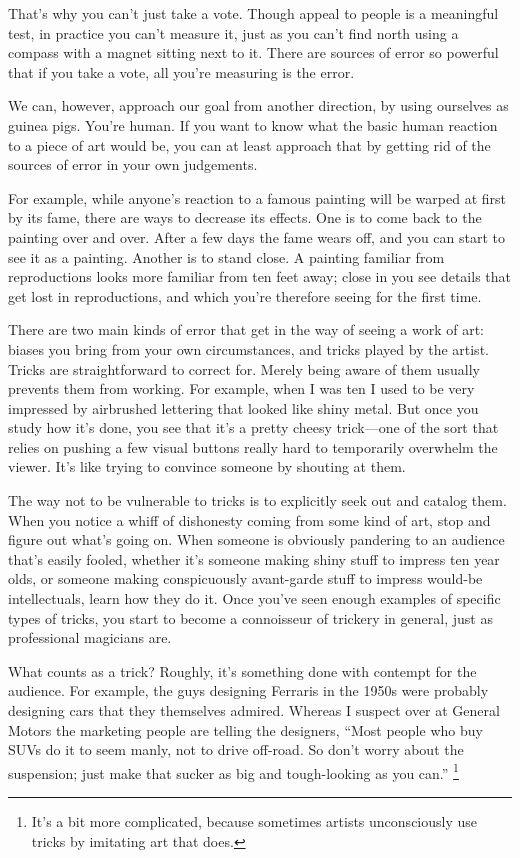 \documentclass[12pt]{book}
\begin{document}
That's why you can't just take a vote. Though appeal to people is a
meaningful test, in practice you can't measure it, just as you can't
find north using a compass with a magnet sitting next to it. There are
sources of error so powerful that if you take a vote, all you're
measuring is the error.

We can, however, approach our goal from another direction, by using
ourselves as guinea pigs. You're human. If you want to know what the
basic human reaction to a piece of art would be, you can at least
approach that by getting rid of the sources of error in your own
judgements.

For example, while anyone's reaction to a famous painting will be warped
at first by its fame, there are ways to decrease its effects. One is to
come back to the painting over and over. After a few days the fame wears
off, and you can start to see it as a painting. Another is to stand
close. A painting familiar from reproductions looks more familiar from
ten feet away; close in you see details that get lost in reproductions,
and which you're therefore seeing for the first time.

There are two main kinds of error that get in the way of seeing a work
of art: biases you bring from your own circumstances, and tricks played
by the artist. Tricks are straightforward to correct for. Merely being
aware of them usually prevents them from working. For example, when I
was ten I used to be very impressed by airbrushed lettering that looked
like shiny metal. But once you study how it's done, you see that it's a
pretty cheesy trick---one of the sort that relies on pushing a few
visual buttons really hard to temporarily overwhelm the viewer. It's
like trying to convince someone by shouting at them.

The way not to be vulnerable to tricks is to explicitly seek out and
catalog them. When you notice a whiff of dishonesty coming from some
kind of art, stop and figure out what's going on. When someone is
obviously pandering to an audience that's easily fooled, whether it's
someone making shiny stuff to impress ten year olds, or someone making
conspicuously avant-garde stuff to impress would-be intellectuals, learn
how they do it. Once you've seen enough examples of specific types of
tricks, you start to become a connoisseur of trickery in general, just
as professional magicians are.

What counts as a trick? Roughly, it's something done with contempt for
the audience. For example, the guys designing Ferraris in the 1950s were
probably designing cars that they themselves admired. Whereas I suspect
over at General Motors the marketing people are telling the designers,
``Most people who buy SUVs do it to seem manly, not to drive off-road.
So don't worry about the suspension; just make that sucker as big and
tough-looking as you can.'' \footnote{It's a bit more complicated, because sometimes artists
unconsciously use tricks by imitating art that does.}
\end{document}
